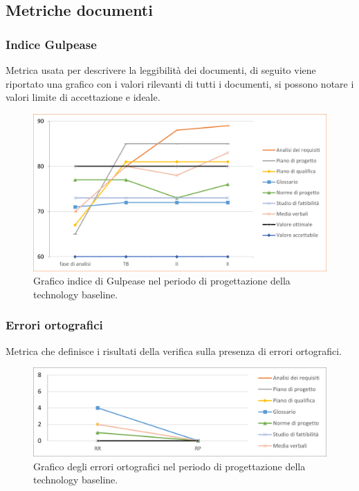 \subsection{Metriche documenti}
\subsubsection{Indice Gulpease}
Metrica usata per descrivere la leggibilità dei documenti, di seguito viene riportato una grafico con i valori rilevanti di tutti i documenti, si possono notare i valori limite di accettazione e ideale.
\begin{figure}[h]
	\centering
	\includegraphics[scale=1]{Images/IndiceDiGulpease.png}
	\caption{Graﬁco indice di Gulpease nel periodo di progettazione della technology baseline.}
\end{figure}
\subsubsection{Errori ortografici}
Metrica che definisce i risultati della veriﬁca sulla presenza di errori ortograﬁci.
\begin{figure}[h]
	\centering
	\includegraphics[scale=1]{Images/ErroriOrtografici.png}
	\caption{Graﬁco degli errori ortograﬁci nel periodo di progettazione della technology baseline.}
\end{figure}